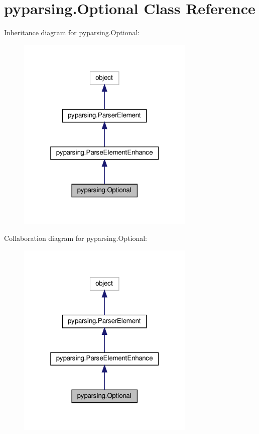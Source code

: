 \hypertarget{classpyparsing_1_1Optional}{}\section{pyparsing.\+Optional Class Reference}
\label{classpyparsing_1_1Optional}


Inheritance diagram for pyparsing.\+Optional\+:
\nopagebreak
\begin{figure}[H]
\begin{center}
\leavevmode
\includegraphics[width=241pt]{classpyparsing_1_1Optional__inherit__graph}
\end{center}
\end{figure}


Collaboration diagram for pyparsing.\+Optional\+:
\nopagebreak
\begin{figure}[H]
\begin{center}
\leavevmode
\includegraphics[width=241pt]{classpyparsing_1_1Optional__coll__graph}
\end{center}
\end{figure}

